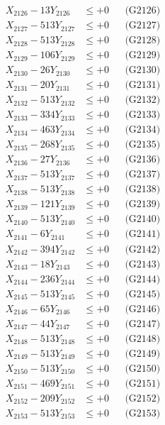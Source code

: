 \documentclass[a4paper,10pt]{article}
\begin{document}
{\begin{align}
X_{2126} - 13Y_{2126} &\leq +0 && \text{(G2126)} \\
X_{2127} - 513Y_{2127} &\leq +0 && \text{(G2127)} \\
X_{2128} - 513Y_{2128} &\leq +0 && \text{(G2128)} \\
X_{2129} - 106Y_{2129} &\leq +0 && \text{(G2129)} \\
X_{2130} - 26Y_{2130} &\leq +0 && \text{(G2130)} \\
\allowbreak
X_{2131} - 20Y_{2131} &\leq +0 && \text{(G2131)} \\
X_{2132} - 513Y_{2132} &\leq +0 && \text{(G2132)} \\
X_{2133} - 334Y_{2133} &\leq +0 && \text{(G2133)} \\
X_{2134} - 463Y_{2134} &\leq +0 && \text{(G2134)} \\
X_{2135} - 268Y_{2135} &\leq +0 && \text{(G2135)} \\
X_{2136} - 27Y_{2136} &\leq +0 && \text{(G2136)} \\
X_{2137} - 513Y_{2137} &\leq +0 && \text{(G2137)} \\
X_{2138} - 513Y_{2138} &\leq +0 && \text{(G2138)} \\
X_{2139} - 121Y_{2139} &\leq +0 && \text{(G2139)} \\
X_{2140} - 513Y_{2140} &\leq +0 && \text{(G2140)} \\
\allowbreak
X_{2141} - 6Y_{2141} &\leq +0 && \text{(G2141)} \\
X_{2142} - 394Y_{2142} &\leq +0 && \text{(G2142)} \\
X_{2143} - 18Y_{2143} &\leq +0 && \text{(G2143)} \\
X_{2144} - 236Y_{2144} &\leq +0 && \text{(G2144)} \\
X_{2145} - 513Y_{2145} &\leq +0 && \text{(G2145)} \\
X_{2146} - 65Y_{2146} &\leq +0 && \text{(G2146)} \\
X_{2147} - 44Y_{2147} &\leq +0 && \text{(G2147)} \\
X_{2148} - 513Y_{2148} &\leq +0 && \text{(G2148)} \\
X_{2149} - 513Y_{2149} &\leq +0 && \text{(G2149)} \\
X_{2150} - 513Y_{2150} &\leq +0 && \text{(G2150)} \\
\allowbreak
X_{2151} - 469Y_{2151} &\leq +0 && \text{(G2151)} \\
X_{2152} - 209Y_{2152} &\leq +0 && \text{(G2152)} \\
X_{2153} - 513Y_{2153} &\leq +0 && \text{(G2153)} \\

\end{align}}
\end{document}
